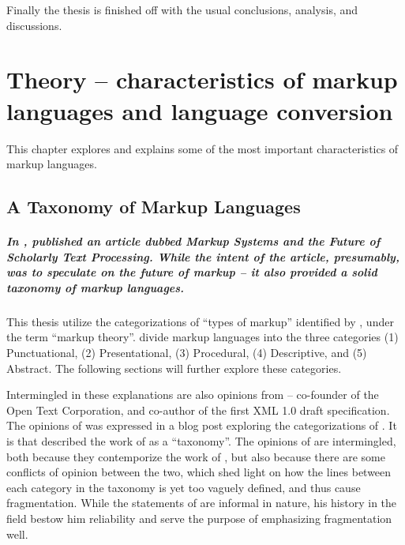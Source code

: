 \documentclass{scrreprt}
\begin{document}
Finally the thesis is finished off with the usual conclusions, analysis, and discussions.
\color{black}

























%
%
%
%
%
%


\chapter{Theory -- characteristics of markup languages and language conversion}
\label{sec:theory}
This chapter explores and explains some of the most important characteristics of markup languages.








\section{A Taxonomy of Markup Languages}
\label{sec:taxonomy}
\paragraph{In \citeyear{coombs}, \citeauthor*{coombs} published an article dubbed \textit{Markup Systems and the Future of Scholarly Text Processing}. While the intent of the article, presumably, was to speculate on the future of markup -- it also provided a solid taxonomy of markup languages.} This thesis utilize the categorizations of ``types of markup'' identified by \citet{coombs}, under the term ``markup theory''. \citet{coombs} divide markup languages into the three categories (1) Punctuational, (2) Presentational, (3) Procedural, (4) Descriptive, and (5) Abstract. The following sections will further explore these categories.

Intermingled in these explanations are also opinions from \citet{bray} -- co-founder of the Open Text Corporation, and co-author of the first XML 1.0 draft specification. The opinions of \citeauthor{bray} was expressed in a blog post exploring the categorizations of \citet{coombs}. It is \citeauthor{bray} that described the work of \citeauthor{coombs} as a ``taxonomy''. The opinions of \citeauthor{bray} are intermingled, both because they contemporize the work of \citeauthor{coombs}, but also because there are some conflicts of opinion between the two, which shed light on how the lines between each category in the taxonomy is yet too vaguely defined, and thus cause fragmentation. While the statements of \citeauthor{bray} are informal in nature, his history in the field bestow him reliability and serve the purpose of emphasizing fragmentation well. 
\end{document}
